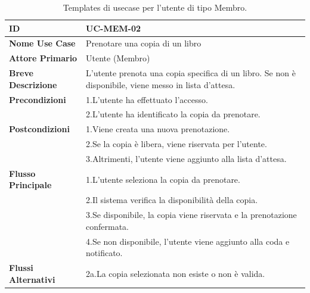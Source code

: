 \documentclass[
  italian,
  paper=a4,
  ,captions=tableheading
]{scrbook}
\begin{document}
\begin{table}[H]
\begin{minipage}{0.45\textwidth}
{\begin{tabular}{|p{4.5cm}|p{10cm}|}
\textbf{ID} & UC-MEM-02 \\ \hline
\textbf{Nome Use Case} & Prenotare una copia di un libro \\ \hline
\textbf{Attore Primario} & Utente (Membro) \\ \hline
\textbf{Breve Descrizione} & L'utente prenota una copia specifica di un libro. Se non è disponibile, viene messo in lista d'attesa. \\ \hline
\textbf{Precondizioni} & 1.\;L'utente ha effettuato l'accesso.\\
 & 2.\;L'utente ha identificato la copia da prenotare. \\ \hline
\textbf{Postcondizioni} & 1.\;Viene creata una nuova prenotazione.\\
 & 2.\;Se la copia è libera, viene riservata per l'utente.\\
 & 3.\;Altrimenti, l'utente viene aggiunto alla lista d'attesa. \\ \hline
\textbf{Flusso Principale} & 1.\;L'utente seleziona la copia da prenotare.\\
 & 2.\;Il sistema verifica la disponibilità della copia.\\
 & 3.\;Se disponibile, la copia viene riservata e la prenotazione confermata.\\
 & 4.\;Se non disponibile, l'utente viene aggiunto alla coda e notificato. \\ \hline
\textbf{Flussi Alternativi} & 2a.\;La copia selezionata non esiste o non è valida. \\ \hline

    \hline
  \end{tabular}
}
\end{minipage}
\caption{Templates di usecase per l'utente di tipo Membro.}

\end{table}
\end{document}
